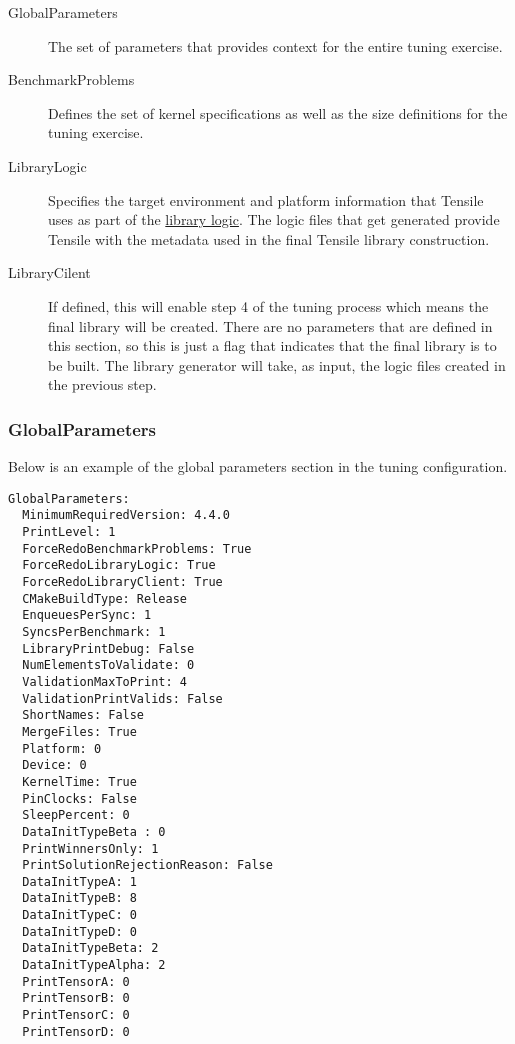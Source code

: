 \documentclass[]{article}
\begin{document}
\begin{description}
\item[GlobalParameters] The set of parameters that provides context for the entire tuning exercise.
\item[BenchmarkProblems] Defines the set of kernel specifications as well as the size definitions for the tuning exercise.
\item[LibraryLogic] Specifies the target environment and platform information that Tensile uses as part of the \hyperref[sec:LibraryLogic]{library logic}. The logic files that get generated provide Tensile with the metadata used in the final Tensile library construction.
\item[LibraryCilent] If defined, this will enable step 4 of the tuning process which means the final library will be created. There are no parameters that are defined in this section, so this is just a flag that indicates that the final library is to be built. The library generator will take, as input, the logic files created in the previous step.
\end{description}

\subsubsection{GlobalParameters}

\noindent
Below is an example of the global parameters section in the tuning configuration. 

\begin{verbatim}
GlobalParameters:
  MinimumRequiredVersion: 4.4.0
  PrintLevel: 1
  ForceRedoBenchmarkProblems: True
  ForceRedoLibraryLogic: True
  ForceRedoLibraryClient: True
  CMakeBuildType: Release
  EnqueuesPerSync: 1
  SyncsPerBenchmark: 1
  LibraryPrintDebug: False
  NumElementsToValidate: 0
  ValidationMaxToPrint: 4
  ValidationPrintValids: False
  ShortNames: False
  MergeFiles: True
  Platform: 0
  Device: 0
  KernelTime: True
  PinClocks: False
  SleepPercent: 0
  DataInitTypeBeta : 0
  PrintWinnersOnly: 1
  PrintSolutionRejectionReason: False
  DataInitTypeA: 1
  DataInitTypeB: 8
  DataInitTypeC: 0
  DataInitTypeD: 0
  DataInitTypeBeta: 2
  DataInitTypeAlpha: 2
  PrintTensorA: 0
  PrintTensorB: 0
  PrintTensorC: 0
  PrintTensorD: 0
\end{verbatim}
\end{document}
